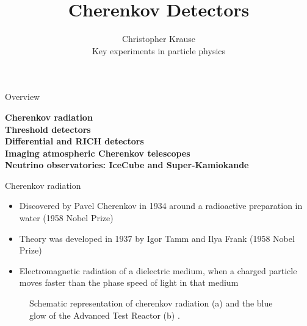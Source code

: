 \documentclass[aspectratio=1610, 10pt]{beamer}
\title{\Large{Cherenkov Detectors}}
\author[C.~Krause]{\normalsize{Christopher Krause \\
Key experiments in particle physics}}
\begin{document}
\maketitle

\begin{frame}{Overview}
  \begin{large}
    \Large \textbf{Cherenkov radiation} \\
    \vspace{0.5cm}
    \textbf{Threshold detectors} \\
    \vspace{0.5cm}
    \textbf{Differential and RICH detectors} \\
    \vspace{0.5cm}
    \textbf{Imaging atmospheric Cherenkov telescopes} \\
    \vspace{0.5cm}
    \textbf{Neutrino observatories: IceCube and Super-Kamiokande} \\
\end{large}
\end{frame}

\begin{frame}{Cherenkov radiation}
  \begin{itemize}
    \item Discovered by Pavel Cherenkov in 1934 around a radioactive preparation in water (1958 Nobel Prize)
    \item Theory was developed in 1937 by Igor Tamm and Ilya Frank (1958 Nobel Prize)
    \item Electromagnetic radiation of a dielectric medium, when a charged particle moves
    faster than the phase speed of light in that medium
  \end{itemize}
  \begin{figure}
      \hspace{1cm}
  \caption{Schematic representation of cherenkov radiation (a) and the blue glow of the Advanced Test Reactor (b) \cite{cone}\cite{atr}.}
  \end{figure}
\end{frame}
\end{document}
